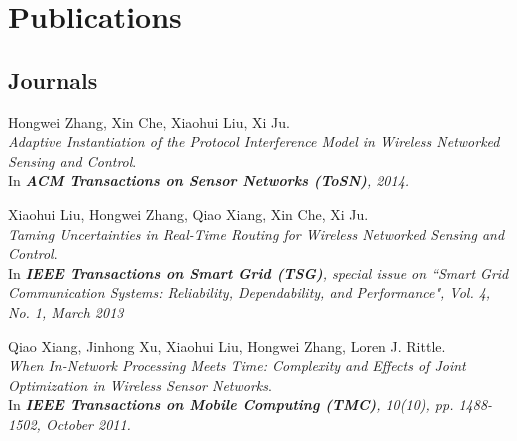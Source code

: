 
\section{Publications}
\subsection{Journals}
\begin{thebibliography}{3}
Hongwei Zhang, Xin Che, Xiaohui Liu, Xi Ju.
\\ \newblock \emph{Adaptive Instantiation of the Protocol Interference Model in Wireless Networked Sensing and Control}.
\\ \newblock In \emph{\textbf{ACM Transactions on Sensor Networks (ToSN)}, 2014.}

Xiaohui Liu, Hongwei Zhang, Qiao Xiang, Xin Che, Xi Ju.
\\ \newblock \emph{Taming Uncertainties in Real-Time Routing for Wireless Networked Sensing and Control}.
\\ \newblock In \emph{\textbf{IEEE Transactions on Smart Grid (TSG)}, special issue on “Smart Grid Communication Systems: Reliability, Dependability, and Performance", Vol. 4, No. 1, March 2013}

Qiao Xiang, Jinhong Xu, Xiaohui Liu, Hongwei Zhang, Loren J. Rittle.
\\ \newblock \emph{When In-Network Processing Meets Time: Complexity and Effects of Joint Optimization in Wireless Sensor Networks}.
\\ \newblock In \emph{\textbf{IEEE Transactions on Mobile Computing (TMC)}, 10(10), pp. 1488-1502, October 2011.}

\end{thebibliography}


